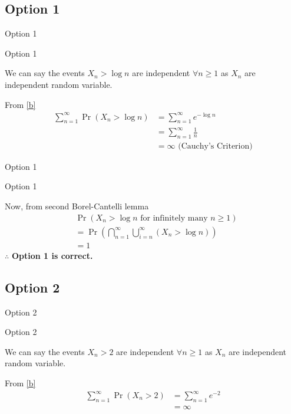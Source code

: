 \documentclass{beamer}
\providecommand{\pr}[1]{\ensuremath{\Pr\left(#1\right)}}
\providecommand{\pr}[1]{\ensuremath{\Pr\left(#1\right)}}
\providecommand{\brak}[1]{\ensuremath{\left(#1\right)}}
\theoremstyle{remark}
\numberwithin{equation}{subsection}
\begin{document}
\subsection{Option 1}
\begin{frame}{Option 1}
\begin{block}{Option 1}

We can say the events $X_n>\log n$ are independent $\forall n\geq 1$ as $X_n$ are independent random variable.
    
    From \eqref{b}
    \begin{align}
        \sum_{n=1}^{\infty}\pr{X_n > \log n} &=\sum_{n=1}^{\infty}e^{-\log n}\nonumber\\ &=\sum_{n=1}^{\infty}\frac{1}{n}\nonumber\\
                                            &= \infty \text{ (Cauchy's Criterion)}\nonumber
    \end{align}
   
\end{block}
\end{frame}

\begin{frame}{Option 1}
\begin{block}{Option 1}

    Now, from second Borel-Cantelli lemma
    \begin{align}
        &\pr{X_n>\log n \text{ for infinitely many }n\geq1}\nonumber\\
        &=\pr{\bigcap_{n=1}^{\infty}\bigcup_{i=n}^{\infty}\brak{X_n>\log n}}\nonumber\\
        &=1\nonumber
    \end{align}
    $\therefore$ \textbf{Option 1 is correct. }

\end{block}
\end{frame}



\subsection{Option 2}
\begin{frame}{Option 2}
\begin{block}{Option 2}

 We can say the events $X_n>2$ are independent $\forall n\geq 1$ as $X_n$ are independent random variable.
    
    From \eqref{b}
    \begin{align}
        \sum_{n=1}^{\infty}\pr{X_n > 2} &= \sum_{n=1}^{\infty}e^{-2}\nonumber\\
                                            &= \infty\nonumber
    \end{align}
   
\end{block}
\end{frame}
\end{document}
